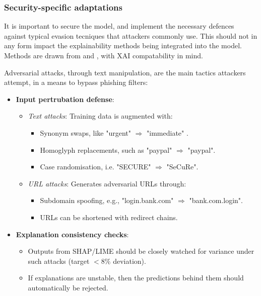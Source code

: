 
\subsubsection*{Security-specific adaptations}
It is important to secure the model, and implement the necessary defences against typical evasion tecniques that attackers commonly use. This should not in any form impact the explainability methods being integrated into the model. Methods are drawn from \cite{kapoor2024comparative} and \cite{atlam2022business}, with XAI compatability in mind.\newline

\noindent Adversarial attacks, through text manipulation, are the main tactics attackers attempt, in a means to bypass phishing filters:

\begin{itemize}
  \item \textbf{Input pertrubation defense}:
  \begin{itemize}
    \item \textit{Text attacks}: Training data is augmented with:
    \begin{itemize}
      \item Synonym swaps, like "urgent" $\Rightarrow$ "immediate" \citep{greco2023explaining}.
      \item Homoglyph replacements, such as "paypal" $\Rightarrow$ "paypal".
      \item Case randomisation, i.e. "SECURE" $\Rightarrow$ "SeCuRe".
    \end{itemize}
    \item \textit{URL attacks}: Generates adversarial URLs through:
    \begin{itemize}
      \item Subdomain spoofing, e.g., "login.bank.com" $\Rightarrow$ "bank.com.login".
      \item URLs can be shortened with redirect chains.
    \end{itemize}
  \end{itemize}
  \item \textbf{Explanation consistency checks}:
  \begin{itemize}
    \item Outputs from SHAP/LIME should be closely watched for variance under such attacks (target $<8\%$ deviation).
    \item If explanations are unstable, then the predictions behind them should automatically be rejected.
  \end{itemize}
\end{itemize}

